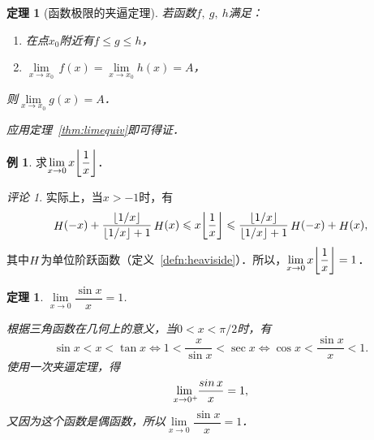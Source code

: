 \documentclass[a4paper,punct=CCT]{ctexbook}
\makeatletter
\renewcommand*{\enumparen}[1]{（\makebox[0.6em][c]{\normalfont#1}）}
\newtheorem{theorem}{定理}
\newtheorem*{theorem*}{定理}
\theoremstyle{definition}
\newtheorem*{example*}{例}
\theoremstyle{remark}
\newtheorem*{remark}{评论}
\renewcommand*{\proofname}{证}
\renewenvironment{proof}[1][\proofname]{\par
  \pushQED{\qed}%
  \normalfont \topsep6\p@\@plus6\p@\relax
  \trivlist
  \item[\hskip\labelsep
    \bfseries
    #1%
    ]\ignorespaces
}{%
  \popQED\endtrivlist\@endpefalse
}
\let\leq\leqslant
\let\le\leq
\makeatother
\begin{document}
\begin{theorem}[函数极限的夹逼定理]
  \label{thm:funcsqueeze}
  若函数\(f,\ g,\ h\)满足：
  \begin{enumerate}[topsep=0ex,itemsep=0ex]
    \renewcommand{\labelenumi}{\enumparen{\arabic{enumi}}}
  \item 在点\(x_0\)附近有\(f \le g \le h\)，
  \item \(\lim\limits_{x \to x_0} \,f(x) = \lim\limits_{x \to x_0} h(x) = A\)，
  \end{enumerate}
  则\(\lim\limits_{x \to x_0} g(x) = A\)．

  \begin{proof}
    应用定理~\ref{thm:limequiv}即可得证．
  \end{proof}
\end{theorem}

\begin{example*}
  求\(\lim\limits_{x\to0} x \floor[\bigg]{\dfrac1x}\)．

  \begin{remark}
    实际上，当\(x > -1\)时，有
    \begin{equation*}
      \Fn H(-x) + \frac{\floor{1/x}}{\floor{1/x}+1} \Fn H(x)
      \le
      x \floor[\bigg]{\dfrac1x}
      \le
      \frac{\floor{1/x}}{\floor{1/x}+1} \Fn H(-x) + \Fn H(x),
    \end{equation*}
    其中\(\Fn H\)为单位阶跃函数（定义~\ref{defn:heaviside}）．所以，\(\lim\limits_{x\to0} x \floor[\bigg]{\dfrac1x} = 1\)．
  \end{remark}
\end{example*}

\begin{theorem*}
  \(\lim\limits_{x\to0} \dfrac{\sin x}{x} = 1\).

  \begin{proof}
    根据三角函数在几何上的意义，当\(0 < x < \pi/2\)时，有
    \begin{equation*}
      \sin x < x < \tan x
      \iff
      1 < \frac{x}{\sin x} < \sec x
      \iff
      \cos x < \frac{\sin x}{x} < 1.
    \end{equation*}
    使用一次夹逼定理，得
    \begin{equation*}
      \lim_{x\to0^+\negthickspace} \frac{\sin x}{x} = 1,
    \end{equation*}
    又因为这个函数是偶函数，所以\(\lim\limits_{x\to0} \dfrac{\sin x}{x} = 1\)．
  \end{proof}
\end{theorem*}
\end{document}
